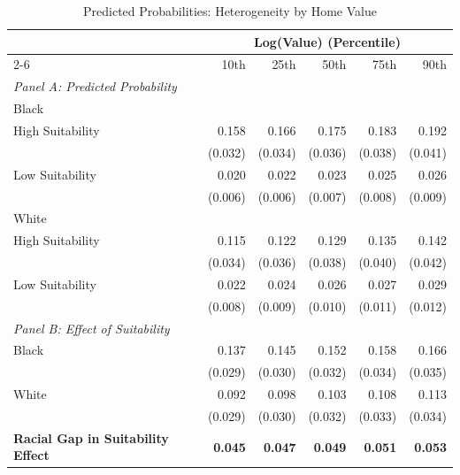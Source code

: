 \begin{table}[h]
\centering
\caption{Predicted Probabilities: Heterogeneity by Home Value}
\label{tab:heterogeneity/suitabilityxblacksharexvalueh}
\begin{threeparttable}
\begin{tabular*}{1\textwidth}{@{\extracolsep{\fill}}lr@{\hspace{1.2em}}r@{\hspace{1.2em}}r@{\hspace{1.2em}}r@{\hspace{1.2em}}r@{\hspace{1.2em}}}
\toprule
 & \multicolumn{5}{c}{Log(Value) (Percentile)} \\
\cmidrule(l){2-6}
 & 10th & 25th & 50th & 75th & 90th \\
\midrule
\textit{Panel A: Predicted Probability} & & & & & \\
\addlinespace[2pt]
Black & & & & & \\
\quad High Suitability & 0.158 & 0.166 & 0.175 & 0.183 & 0.192 \\
 & (0.032) & (0.034) & (0.036) & (0.038) & (0.041) \\[4pt]
\quad Low Suitability & 0.020 & 0.022 & 0.023 & 0.025 & 0.026 \\
 & (0.006) & (0.006) & (0.007) & (0.008) & (0.009) \\[4pt]
White & & & & & \\
\quad High Suitability & 0.115 & 0.122 & 0.129 & 0.135 & 0.142 \\
 & (0.034) & (0.036) & (0.038) & (0.040) & (0.042) \\[4pt]
\quad Low Suitability & 0.022 & 0.024 & 0.026 & 0.027 & 0.029 \\
 & (0.008) & (0.009) & (0.010) & (0.011) & (0.012) \\[4pt]
\midrule
\textit{Panel B: Effect of Suitability} & & & & & \\
\addlinespace[2pt]
Black & 0.137\rlap{$^{***}$} & 0.145\rlap{$^{***}$} & 0.152\rlap{$^{***}$} & 0.158\rlap{$^{***}$} & 0.166\rlap{$^{***}$} \\
 & (0.029) & (0.030) & (0.032) & (0.034) & (0.035) \\[4pt]
White & 0.092\rlap{$^{***}$} & 0.098\rlap{$^{***}$} & 0.103\rlap{$^{***}$} & 0.108\rlap{$^{***}$} & 0.113\rlap{$^{***}$} \\
 & (0.029) & (0.030) & (0.032) & (0.033) & (0.034) \\[4pt]
\addlinespace[2pt]
\textbf{Racial Gap in Suitability Effect} & \textbf{0.045}\rlap{$^{**}$} & \textbf{0.047}\rlap{$^{**}$} & \textbf{0.049}\rlap{$^{**}$} & \textbf{0.051}\rlap{$^{**}$} & \textbf{0.053}\rlap{$^{**}$} \\

\end{tabular*}
\end{threeparttable}
\end{table}
